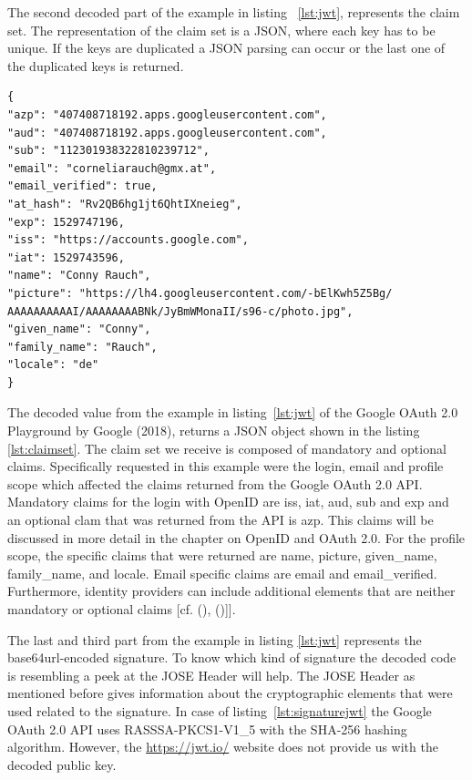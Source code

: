 The second decoded part of the example in listing ~\ref{lst:jwt}, represents the claim set. The representation of the claim set is a JSON, where each key has to be unique. If the keys are duplicated a JSON parsing can occur or the last one of the duplicated keys is returned. 
\pagebreak[4]

\begin{lstlisting}
{
"azp": "407408718192.apps.googleusercontent.com",
"aud": "407408718192.apps.googleusercontent.com",
"sub": "112301938322810239712",
"email": "corneliarauch@gmx.at",
"email_verified": true,
"at_hash": "Rv2QB6hg1jt6QhtIXneieg",
"exp": 1529747196,
"iss": "https://accounts.google.com",
"iat": 1529743596,
"name": "Conny Rauch",
"picture": "https://lh4.googleusercontent.com/-bElKwh5Z5Bg/
AAAAAAAAAAI/AAAAAAAABNk/JyBmWMonaII/s96-c/photo.jpg",
"given_name": "Conny",
"family_name": "Rauch",
"locale": "de"
}
\end{lstlisting}

The decoded value from the example in listing~\ref{lst:jwt} of the Google OAuth 2.0 Playground  by Google (2018), returns a JSON object shown in the listing \ref{lst:claimset}. The claim set we receive is composed of mandatory and optional claims. Specifically requested in this example were the login, email and profile scope which affected the claims returned from the Google OAuth 2.0 API. Mandatory claims for the login with OpenID are iss, iat, aud, sub and exp and an optional clam that was returned from the API is azp. This claims will be discussed in more detail in the chapter on OpenID and OAuth 2.0. For the profile scope, the specific claims that were returned are name, picture, given\_name, family\_name, and locale. Email specific claims are email and email\_verified. Furthermore, identity providers can include additional elements that are neither mandatory or optional claims [cf. ({\cite{Google:2018:OAuthPlayground}), (\cite{Siriwardena:JWTJWSJWE:2016})]}].

The last and third part from the example in listing \ref{lst:jwt}  represents the base64url-encoded signature. To know which kind of signature the decoded code is resembling a peek at the JOSE Header will help. The JOSE Header as mentioned before gives information about the cryptographic elements that were used related to the signature. In case of listing~\ref{lst:signaturejwt} the Google OAuth 2.0 API uses RASSSA-PKCS1-V1\_5 with the SHA-256 hashing algorithm. However, the \href{https://jwt.io/} {https://jwt.io/} website does not provide us with the decoded public key. 
\pagebreak[4]

